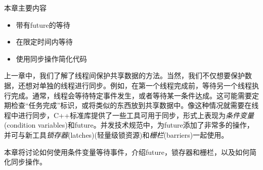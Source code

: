 
本章主要内容

\begin{itemize}
    \item 带有future的等待
    \item 在限定时间内等待
    \item 使用同步操作简化代码
\end{itemize}


上一章中，我们了解了线程间保护共享数据的方法。当然，我们不仅想要保护数据，还想对单独的线程进行同步。例如，在第一个线程完成前，等待另一个线程执行完成。通常，线程会等待特定事件发生，或者等待某一条件达成。这可能需要定期检查“任务完成”标识，或将类似的东西放到共享数据中。像这种情况就需要在线程中进行同步，C++标准库提供了一些工具可用于同步，形式上表现为\textit{条件变量}(condition variables)和future。并发技术规范中，为future添加了非常多的操作，并可与新工具\textit{锁存器}(latches)(轻量级锁资源)和\textit{栅栏}(barriers)一起使用。

本章将讨论如何使用条件变量等待事件，介绍future，锁存器和栅栏，以及如何简化同步操作。